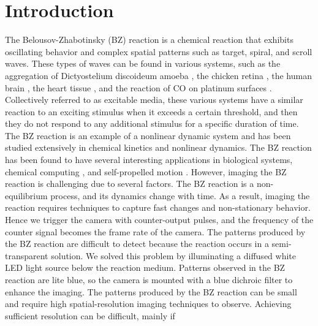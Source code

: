 \documentclass[journal=jacsat,manuscript=article]{achemso}
\begin{document}
\section{Introduction}
The Belousov-Zhabotinsky (BZ) reaction is a chemical reaction that
exhibits oscillating behavior and complex spatial patterns such as
target, spiral, and scroll waves. These types of waves can be found in
various systems, such as the aggregation of Dictyostelium discoideum
amoeba \cite{tan2020topological}, the chicken retina
\cite{yu2012reentrant}, the human brain \cite{rostami2018defects}, the
heart tissue \cite{lebert2023reconstruction}, and the reaction of CO
on platinum surfaces \cite{bhattacharya2019controlling}.  Collectively
referred to as excitable media, these various systems have a similar
reaction to an exciting stimulus when it exceeds a certain threshold,
and then they do not respond to any additional stimulus for a specific
duration of time. The BZ reaction is an example of a nonlinear dynamic
system and has been studied extensively in chemical kinetics and
nonlinear dynamics. The BZ reaction has been found to have several
interesting applications in biological systems, chemical computing
\cite{steinbock1996chemical}\cite{gruenert2013multi}, and
self-propelled motion
\cite{kumar2021fast}\cite{suematsu2018evolution}.
However, imaging the BZ reaction is challenging due to several
factors. The BZ reaction is a non-equilibrium process, and its
dynamics change with time. As a result, imaging the reaction requires
techniques to capture fast changes and non-stationary behavior. Hence
we trigger the camera with counter-output pulses, and the frequency of
the counter signal becomes the frame rate of the camera. The patterns
produced by the BZ reaction are difficult to detect because the
reaction occurs in a semi-transparent solution. We solved this problem
by illuminating a diffused white LED light source below the reaction
medium. Patterns observed in the BZ reaction are lite blue, so the
camera is mounted with a blue dichroic filter to enhance the
imaging. The patterns produced by the BZ reaction can be small and
require high spatial-resolution imaging techniques to
observe. Achieving sufficient resolution can be difficult, mainly if
\end{document}
